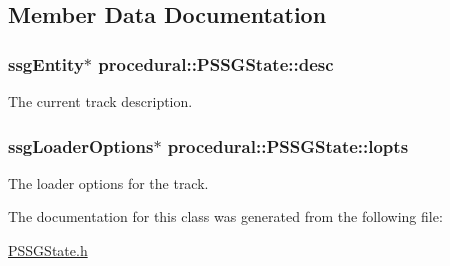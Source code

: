 \subsection{Member Data Documentation}
\hypertarget{classprocedural_1_1_p_s_s_g_state_a1fafaa73d84de0fda20c7f36d7f32301}{
\subsubsection[{desc}]{\setlength{\rightskip}{0pt plus 5cm}ssg\-Entity$\ast$ procedural\-::\-P\-S\-S\-G\-State\-::desc\hspace{0.3cm}{\ttfamily [private]}}}\label{classprocedural_1_1_p_s_s_g_state_a1fafaa73d84de0fda20c7f36d7f32301}
The current track description. \hypertarget{classprocedural_1_1_p_s_s_g_state_a7ceeefffacba2633fd7fb490b2ff3332}{
\subsubsection[{lopts}]{\setlength{\rightskip}{0pt plus 5cm}ssg\-Loader\-Options$\ast$ procedural\-::\-P\-S\-S\-G\-State\-::lopts\hspace{0.3cm}{\ttfamily [private]}}}\label{classprocedural_1_1_p_s_s_g_state_a7ceeefffacba2633fd7fb490b2ff3332}
The loader options for the track. 

The documentation for this class was generated from the following file\-:\begin{DoxyCompactItemize}
\item 
\hyperlink{_p_s_s_g_state_8h}{P\-S\-S\-G\-State.\-h}\end{DoxyCompactItemize}
